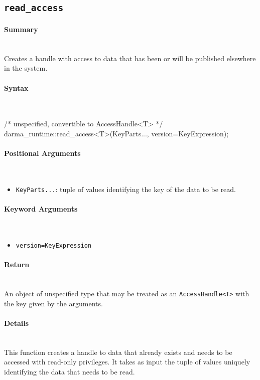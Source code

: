 \subsection{\texttt{read\_access}}
\label{ssec:api_fe_read_access}

\paragraph{Summary}\mbox{}\\
Creates a handle with  access to data that has been or will be
published elsewhere in the system.

\paragraph{Syntax}\mbox{}\\
\begin{CppCode}
/* unspecified, convertible to AccessHandle<T> */
darma_runtime::read_access<T>(KeyParts..., version=KeyExpression);
\end{CppCode}

\paragraph{Positional Arguments}\mbox{}\\
\begin{itemize}
  \item \texttt{KeyParts...}: tuple of values identifying the key of the data to
  be read.
\end{itemize}

\paragraph{Keyword Arguments}\mbox{}\\
\begin{itemize}
  \item \texttt{version=KeyExpression} 
\end{itemize}


\paragraph{Return}\mbox{}\\
An object of unspecified type that may be treated as an \texttt{AccessHandle<T>}
with the key given by the arguments.

\paragraph{Details}\mbox{}\\
This function creates a handle to data that already exists and 
needs to be accessed with read-only privileges. 
It takes as input the tuple of values uniquely 
identifying the data that needs to be read.  

